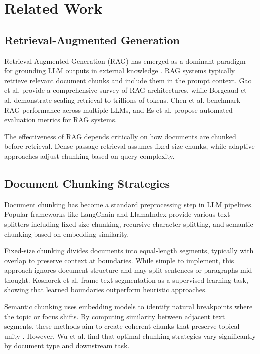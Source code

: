 \documentclass[journal]{IEEEtran}
\begin{document}
\section{Related Work}

\subsection{Retrieval-Augmented Generation}

Retrieval-Augmented Generation (RAG) has emerged as a dominant paradigm for grounding LLM outputs in external knowledge \cite{lewis2020retrieval}. RAG systems typically retrieve relevant document chunks and include them in the prompt context. Gao et al. \cite{gao2023retrieval} provide a comprehensive survey of RAG architectures, while Borgeaud et al. \cite{borgeaud2022improving} demonstrate scaling retrieval to trillions of tokens. Chen et al. \cite{chen2024benchmarking} benchmark RAG performance across multiple LLMs, and Es et al. \cite{es2024ragas} propose automated evaluation metrics for RAG systems.

The effectiveness of RAG depends critically on how documents are chunked before retrieval. Dense passage retrieval \cite{chen2023dense} assumes fixed-size chunks, while adaptive approaches \cite{solbiati2024adaptive} adjust chunking based on query complexity.

\subsection{Document Chunking Strategies}

Document chunking has become a standard preprocessing step in LLM pipelines. Popular frameworks like LangChain \cite{langchain2024} and LlamaIndex \cite{llamaindex2024} provide various text splitters including fixed-size chunking, recursive character splitting, and semantic chunking based on embedding similarity.

Fixed-size chunking divides documents into equal-length segments, typically with overlap to preserve context at boundaries. While simple to implement, this approach ignores document structure and may split sentences or paragraphs mid-thought. Koshorek et al. \cite{koshorek2018text} frame text segmentation as a supervised learning task, showing that learned boundaries outperform heuristic approaches.

Semantic chunking uses embedding models to identify natural breakpoints where the topic or focus shifts. By computing similarity between adjacent text segments, these methods aim to create coherent chunks that preserve topical unity \cite{reimers2019sentence}. However, Wu et al. \cite{wu2024mitigating} find that optimal chunking strategies vary significantly by document type and downstream task.
\end{document}
